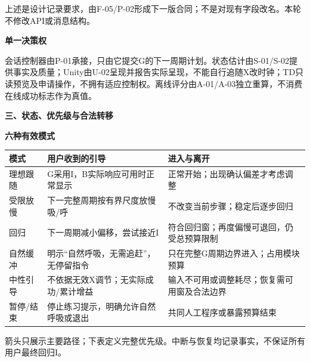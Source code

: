 \documentclass[11pt,a4paper]{article}
\newcommand{\reviewsection}[1]{\par\Needspace{6\baselineskip}\begin{center}{\titlelatin\titlecjk\bfseries\fontsize{14}{20}\selectfont #1}\end{center}}
\newcommand{\reviewsubsection}[1]{\par\Needspace{4\baselineskip}\begin{center}{\titlelatin\titlecjk\bfseries\fontsize{12}{18}\selectfont #1}\end{center}}
\begin{document}
上述是设计记录要求，由F-05/P-02形成下一版合同；不是对现有字段改名。本轮不修改API或消息结构。

\reviewsubsection{2.2 单一决策权}
会话控制器由P-01承接，只由它提交G的下一周期计划。状态估计由S-01/S-02提供事实及质量；Unity由U-02呈现并报告实际呈现，不能自行追随X改时钟；TD只读预览及申请操作，不拥有适应控制权。离线评分由A-01/A-03独立重算，不消费在线成功标志作为真值。

\reviewsection{三、状态、优先级与合法转移}
\reviewsubsection{3.1 六种有效模式}
\begin{longtable}{L{31mm}L{69mm}L{54mm}}
模式 & 用户收到的引导 & 进入与离开\\\hline
理想跟随 & G采用I，B实际响应可用时正常显示 & 正常开始；出现确认偏差才考虑调整\\
受限放慢 & 下一完整周期按有界尺度放慢吸/呼 & 不改变当前步骤；稳定后逐步回归\\
回归 & 下一周期减小偏移，尝试接近I & 符合回归窗；再度偏慢可退回，仍受总预算限制\\
自然缓冲 & 明示“自然呼吸，无需追赶”，无停留指令 & 只在完整G周期边界进入；占用模块预算\\
中性引导 & 不依据无效X调节；无实际成功/累计增益 & 输入不可用或调整耗尽；恢复需可用窗及合法边界\\
暂停/结束 & 停止练习提示，明确允许自然呼吸或退出 & 共同人工程序或暴露预算结束\\
\end{longtable}

\begin{center}
\end{center}
箭头只展示主要路径；下表定义完整优先级。中断与恢复均记录事实，不保证所有用户最终回归I。
\end{document}
